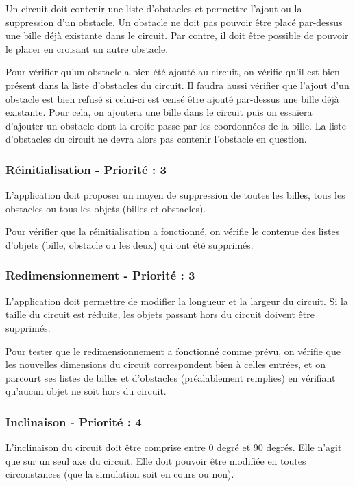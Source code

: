 \documentclass{report}
\begin{document}
Un circuit doit contenir une liste d’obstacles et permettre l’ajout ou la suppression d’un obstacle. Un obstacle ne doit pas pouvoir être placé par-dessus une bille déjà existante dans le circuit. Par contre, il doit être possible de pouvoir le placer en croisant un autre obstacle.

Pour vérifier qu’un obstacle a bien été ajouté au circuit, on vérifie qu’il est bien présent dans la liste d’obstacles du circuit. Il faudra aussi vérifier que l’ajout d’un obstacle est bien refusé si celui-ci est censé être ajouté par-dessus une bille déjà existante. Pour cela, on ajoutera une bille dans le circuit puis on essaiera d’ajouter un obstacle dont la droite passe par les coordonnées de la bille. La liste d’obstacles du circuit ne devra alors pas contenir l’obstacle en question.


\subsubsection{Réinitialisation - Priorité : 3}

L’application doit proposer un moyen de suppression de toutes les billes, tous les obstacles ou tous les objets (billes et obstacles).

Pour vérifier que la réinitialisation a fonctionné, on vérifie le contenue des listes d’objets (bille, obstacle ou les deux) qui ont été supprimés.


\subsubsection{Redimensionnement - Priorité : 3}

L’application doit permettre de modifier la longueur et la largeur du circuit. Si la taille du circuit est réduite, les objets passant hors du circuit doivent être supprimés.

Pour tester que le redimensionnement a fonctionné comme prévu, on vérifie que les nouvelles dimensions du circuit correspondent bien à celles entrées, et on parcourt ses listes de billes et d’obstacles (préalablement remplies) en vérifiant qu’aucun objet ne soit hors du circuit.


\subsubsection{Inclinaison - Priorité : 4}

L’inclinaison du circuit doit être comprise entre 0 degré et 90 degrés. Elle n’agit que sur un seul axe du circuit. Elle doit pouvoir être modifiée en toutes circonstances (que la simulation soit en cours ou non).
\end{document}
